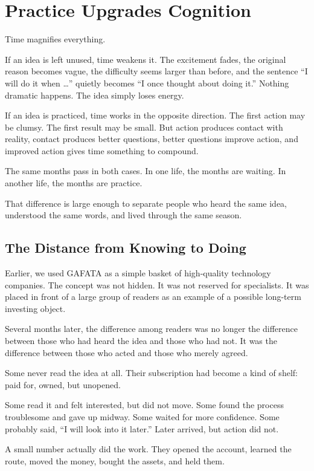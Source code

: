 \chapter{Practice Upgrades Cognition}

Time magnifies everything.

If an idea is left unused, time weakens it. The excitement fades, the original reason becomes vague, the difficulty seems larger than before, and the sentence ``I will do it when \ldots'' quietly becomes ``I once thought about doing it.'' Nothing dramatic happens. The idea simply loses energy.

If an idea is practiced, time works in the opposite direction. The first action may be clumsy. The first result may be small. But action produces contact with reality, contact produces better questions, better questions improve action, and improved action gives time something to compound.

The same months pass in both cases. In one life, the months are waiting. In another life, the months are practice.

That difference is large enough to separate people who heard the same idea, understood the same words, and lived through the same season.

\section*{The Distance from Knowing to Doing}

Earlier, we used GAFATA as a simple basket of high-quality technology companies. The concept was not hidden. It was not reserved for specialists. It was placed in front of a large group of readers as an example of a possible long-term investing object.

Several months later, the difference among readers was no longer the difference between those who had heard the idea and those who had not. It was the difference between those who acted and those who merely agreed.

Some never read the idea at all. Their subscription had become a kind of shelf: paid for, owned, but unopened.

Some read it and felt interested, but did not move. Some found the process troublesome and gave up midway. Some waited for more confidence. Some probably said, ``I will look into it later.'' Later arrived, but action did not.

A small number actually did the work. They opened the account, learned the route, moved the money, bought the assets, and held them.

